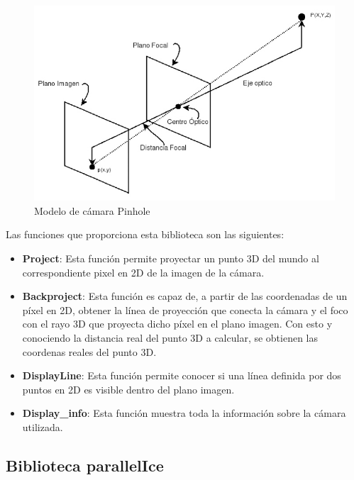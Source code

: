\begin{figure}[th]
\centering
\includegraphics[scale=0.5]{Figures/pinhole-model.jpg}
\decoRule
\caption[Modelo \textit{Pinhole}]{Modelo de cámara Pinhole}
\label{fig:Pinhole}
\end{figure}

Las funciones que proporciona esta biblioteca son las siguientes:

\begin{itemize}
\item \textbf{Project}: Esta función permite proyectar un punto 3D del mundo al correspondiente pixel en 2D de la imagen de la cámara. 

\item \textbf{Backproject}: Esta función es capaz de, a partir de las coordenadas de un píxel en 2D, obtener la línea de proyección que conecta la cámara y el foco con el rayo 3D que proyecta dicho píxel en el plano imagen. Con esto y conociendo la distancia real del punto 3D a calcular, se obtienen las coordenas reales del punto 3D.

\item \textbf{DisplayLine}: Esta función permite conocer si una línea definida por dos puntos en 2D es visible dentro del plano imagen. 

\item \textbf{Display\_info}: Esta función muestra toda la información sobre la cámara utilizada.

\end{itemize}

\subsection{Biblioteca parallelIce}

